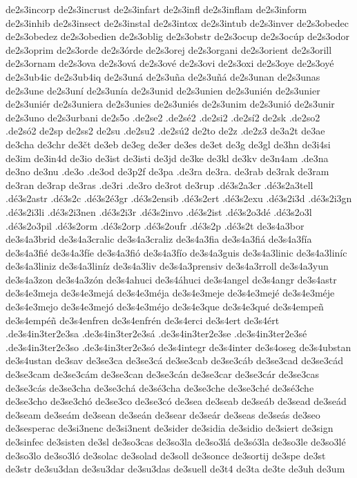 de2s3incorp
de2s3incrust
de2s3infart
de2s3infl
de2s3inflam
de2s3inform
de2s3inhib
de2s3insect
de2s3instal
de2s3intox
de2s3intub
de2s3inver
de2s3obedec
de2s3obedez
de2s3obedien
de2s3oblig
de2s3obstr
de2s3ocup
de2s3ocúp
de2s3odor
de2s3oprim
de2s3orde
de2s3órde
de2s3orej
de2s3organi
de2s3orient
de2s3orill
de2s3ornam
de2s3ova
de2s3ová
de2s3ové
de2s3ovi
de2s3oxi
de2s3oye
de2s3oyé
de2s3ub4ic
de2s3ub4iq
de2s3uná
de2s3uña
de2s3uñá
de2s3unan
de2s3unas
de2s3une
de2s3uní
de2s3unía
de2s3unid
de2s3unien
de2s3unién
de2s3unier
de2s3uniér
de2s3uniera
de2s3unies
de2s3uniés
de2s3unim
de2s3unió
de2s3unir
de2s3uno
de2s3urbani
de2s5o
.de2se2
.de2sé2
.de2si2
.de2sí2
de2sk
.de2so2
.de2só2
de2sp
de2ss2
de2su
.de2su2
.de2sú2
de2to
de2z
.de2z3
de3a2t
de3ae
de3cha
de3chr
de3čt
de3eb
de3eg
de3er
de3es
de3et
de3g
de3gl
de3hn
de3i4si
de3im
de3in4d
de3io
de3ist
de3isti
de3jd
de3ke
de3kl
de3kv
de3n4am
.de3na
de3no
de3nu
.de3o
.de3od
de3p2f
de3pa
.de3ra
de3ra.
de3rab
de3rak
de3ram
de3ran
de3rap
de3ras
.de3ri
.de3ro
de3rot
de3rup
.dé3s2a3cr
.dé3s2a3tell
.dé3s2astr
.dé3s2c
.dé3s2é3gr
.dé3s2ensib
.dé3s2ert
.dé3s2exu
.dé3s2i3d
.dé3s2i3gn
.dé3s2i3li
.dé3s2i3nen
.dé3s2i3r
.dé3s2invo
.dé3s2ist
.dé3s2o3dé
.dé3s2o3l
.dé3s2o3pil
.dé3s2orm
.dé3s2orp
.dé3s2oufr
.dé3s2p
.dé3s2t
de3s4a3bor
de3s4a3brid
de3s4a3cralic
de3s4a3craliz
de3s4a3fia
de3s4a3fiá
de3s4a3fía
de3s4a3fié
de3s4a3fíe
de3s4a3fió
de3s4a3fío
de3s4a3guis
de3s4a3linic
de3s4a3liníc
de3s4a3liniz
de3s4a3liníz
de3s4a3liv
de3s4a3prensiv
de3s4a3rroll
de3s4a3yun
de3s4a3zon
de3s4a3zón
de3s4ahuci
de3s4áhuci
de3s4angel
de3s4angr
de3s4astr
de3s4e3meja
de3s4e3mejá
de3s4e3méja
de3s4e3meje
de3s4e3mejé
de3s4e3méje
de3s4e3mejo
de3s4e3mejó
de3s4e3méjo
de3s4e3que
de3s4e3qué
de3s4empeñ
de3s4empéñ
de3s4enfren
de3s4enfrén
de3s4erci
de3s4ert
de3s4ért
.de3s4in3ter2e3sa
.de3s4in3ter2e3sá
.de3s4in3ter2e3se
.de3s4in3ter2e3sé
.de3s4in3ter2e3so
.de3s4in3ter2e3só
de3s4integr
de3s4inter
de3s4oseg
de3s4ubstan
de3s4ustan
de3sav
de3se3ca
de3se3cá
de3se3cab
de3se3cáb
de3se3cad
de3se3cád
de3se3cam
de3se3cám
de3se3can
de3se3cán
de3se3car
de3se3cár
de3se3cas
de3se3cás
de3se3cha
de3se3chá
de3sé3cha
de3se3che
de3se3ché
de3sé3che
de3se3cho
de3se3chó
de3se3co
de3se3có
de3sea
de3seab
de3seáb
de3sead
de3seád
de3seam
de3seám
de3sean
de3seán
de3sear
de3seár
de3seas
de3seás
de3seo
de3sesperac
de3si3nenc
de3si3nent
de3sider
de3sidia
de3sidio
de3siert
de3sign
de3sinfec
de3sisten
de3sl
de3so3cas
de3so3la
de3so3lá
de3só3la
de3so3le
de3so3lé
de3so3lo
de3so3ló
de3solac
de3solad
de3soll
de3sonce
de3sortij
de3spe
de3st
de3str
de3su3dan
de3su3dar
de3su3das
de3suell
de3t4
de3ta
de3te
de3uh
de3um
